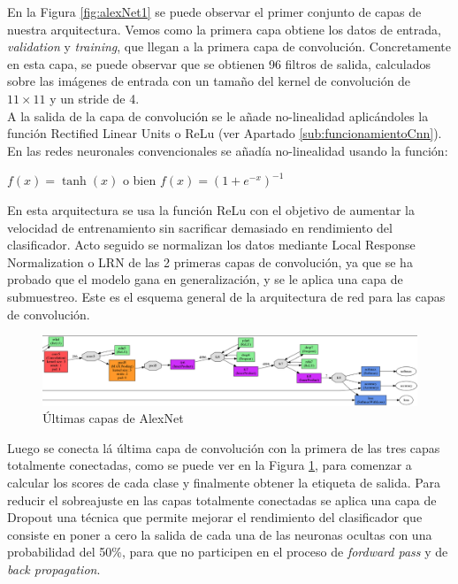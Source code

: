 \documentclass[a4paper,11pt]{book}
\begin{document}
En la Figura \ref{fig:alexNet1} se puede observar el primer conjunto de capas de nuestra arquitectura. Vemos como la primera capa obtiene los datos de entrada, \textit{validation} y \textit{training}, que llegan a la primera capa de convolución. Concretamente en esta capa, se puede observar que se obtienen 96 filtros de salida, calculados sobre las imágenes de entrada con un tamaño del kernel de convolución de \(11\times11\) y un stride de 4.\\
A la salida de la capa de convolución se le añade no-linealidad aplicándoles la función Rectified Linear Units o ReLu (ver Apartado \ref{sub:funcionamientoCnn}). En las redes neuronales convencionales se añadía no-linealidad usando la función:
\begin{center}
	\(f(x) = \tanh(x)\) o bien \(f(x) = (1+e^{-x})^{-1}\)
\end{center}
En esta arquitectura se usa la función ReLu con el objetivo de aumentar la velocidad de entrenamiento sin sacrificar demasiado en rendimiento del clasificador. Acto seguido se normalizan los datos mediante Local Response Normalization o LRN de las 2 primeras capas de convolución, ya que se ha probado que el modelo gana en generalización\cite{krizhevsky12}, y se le aplica una capa de submuestreo. Este es el esquema general de la arquitectura de red para las capas de convolución.
\begin{figure}[h]
	\centering
	\includegraphics[width=1\linewidth]{imagenes/alexNet2}
	\caption[AlexNet input]{Últimas capas de AlexNet}
	\label{fig:alexNet2}
\end{figure}
Luego se conecta lá última capa de convolución con la primera de las tres capas totalmente conectadas, como se puede ver en la Figura \ref{fig:alexNet2}, para comenzar a calcular los scores de cada clase y finalmente obtener la etiqueta de salida. Para reducir el sobreajuste en las capas totalmente conectadas se aplica una capa de Dropout una técnica que permite mejorar el rendimiento del clasificador que consiste en poner a cero la salida de cada una de las neuronas ocultas con una probabilidad del 50\%, para que no participen en el proceso de \textit{fordward pass} y de \textit{back propagation}. 
\end{document}
